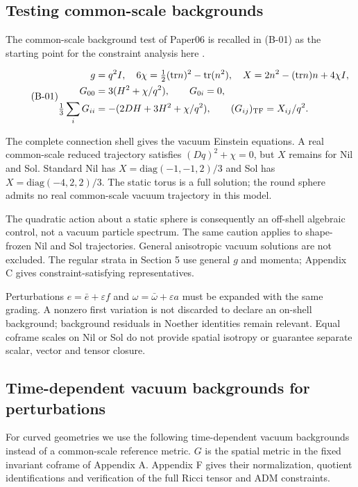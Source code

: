 \subsection{Testing common-scale backgrounds}

The common-scale background test of Paper06 is recalled in (B-01) as the starting point for the constraint analysis here \cite{paper6}.

\begin{equation}\tag{B-01}\label{eq:B-01}
\begin{aligned}g&=q^2 I,\quad 6\chi=\tfrac12(\mathrm{tr}n)^2-\mathrm{tr}(n^2),\quad X=2n^2-(\mathrm{tr}n)n+4\chi I,\\ G_{00}&=3(H^2+\chi/q^2),\qquad G_{0i}=0,\\ \tfrac13\sum_iG_{ii}&=-(2DH+3H^2+\chi/q^2),\qquad (G_{ij})_{\rm TF}=X_{ij}/q^2.\end{aligned}
\end{equation}

The complete connection shell gives the vacuum Einstein equations. A real common-scale reduced trajectory satisfies $(Dq)^2+\chi=0$, but $X$ remains for Nil and Sol. Standard Nil has $X=\mathrm{diag}(-1,-1,2)/3$ and Sol has $X=\mathrm{diag}(-4,2,2)/3$. The static torus is a full solution; the round sphere admits no real common-scale vacuum trajectory in this model.

The quadratic action about a static sphere is consequently an off-shell algebraic control, not a vacuum particle spectrum. The same caution applies to shape-frozen Nil and Sol trajectories. General anisotropic vacuum solutions are not excluded. The regular strata in Section 5 use general $g$ and momenta; Appendix C gives constraint-satisfying representatives.

Perturbations $e=\bar e+\varepsilon f$ and $\omega=\bar\omega+\varepsilon a$ must be expanded with the same grading. A nonzero first variation is not discarded to declare an on-shell background; background residuals in Noether identities remain relevant. Equal coframe scales on Nil or Sol do not provide spatial isotropy or guarantee separate scalar, vector and tensor closure.


\subsection{Time-dependent vacuum backgrounds for perturbations}

For curved geometries we use the following time-dependent vacuum backgrounds instead of a common-scale reference metric. $G$ is the spatial metric in the fixed invariant coframe of Appendix A. Appendix F gives their normalization, quotient identifications and verification of the full Ricci tensor and ADM constraints.

